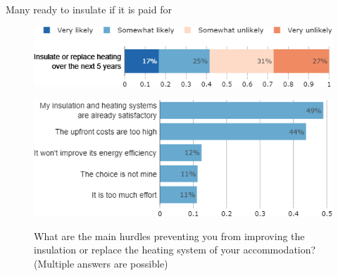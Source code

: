 \begin{framefont}{\small}
\begin{frame}{Many ready to insulate if it is paid for}%
\vspace{-.5cm}
\begin{figure}[h!]
\caption{How likely is it that you will improve the insulation or replace the heating system of your accommodation over the next 5 years?}
\includegraphics[width=.52\paperwidth]{../figures/FR/will_insulate_FR.png} \\
\vspace{.1cm}
\caption{What are the main hurdles preventing you from improving the insulation or replace the heating system of your accommodation? (Multiple answers are possible)}
\includegraphics[width=.47\paperwidth]{../figures/FR/obstacles_insulation_FR.png}\\
\end{figure}
\end{frame}


\end{framefont}
